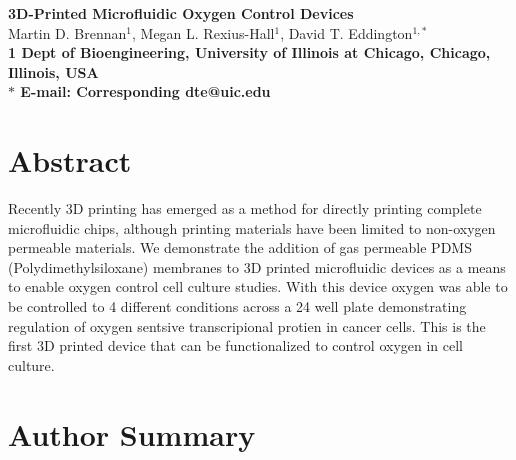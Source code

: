 \pagestyle{myheadings}







\begin{flushleft}
{\Large
\textbf{3D-Printed Microfluidic Oxygen Control Devices}
}
\\
Martin D. Brennan$^{1}$, 
Megan L. Rexius-Hall$^{1}$, 
David T. Eddington$^{1,\ast}$
\\
\bf{1} Dept of Bioengineering, University of Illinois at Chicago, Chicago, Illinois, USA
\\
$\ast$ E-mail: Corresponding dte@uic.edu
\end{flushleft}

\section*{Abstract}

Recently 3D printing has emerged as a method for directly printing complete microfluidic chips, 
although printing materials have been limited to non-oxygen permeable materials.
We demonstrate the addition of gas permeable PDMS (Polydimethylsiloxane) membranes to 3D printed microfluidic devices as a means to enable oxygen control cell culture studies.
With this device oxygen was able to be controlled to 4 different conditions across a 24 well plate demonstrating regulation of oxygen sentsive transcripional protien in cancer cells.
This is the first 3D printed device that can be functionalized to control oxygen in cell culture.


\section*{Author Summary}



